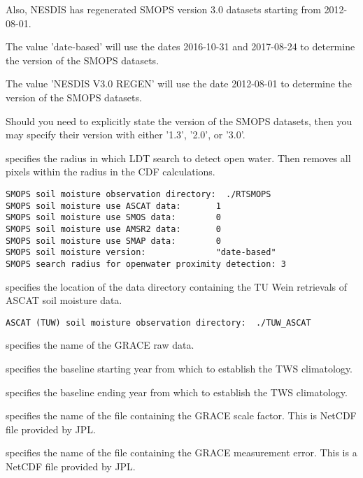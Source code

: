  Also, NESDIS has regenerated SMOPS version 3.0 datasets starting
 from 2012-08-01.
 
 The value 'date-based' will use the dates 2016-10-31 and 2017-08-24
 to determine the version of the SMOPS datasets.
 
 The value 'NESDIS V3.0 REGEN' will use the date 2012-08-01
 to determine the version of the SMOPS datasets.
 
 Should you need to explicitly state the version of the SMOPS datasets,
 then you may specify their version with either '1.3', '2.0', or '3.0'.

 specifies the radius in which LDT search to detect open water.
 Then removes all pixels within the radius in the CDF calculations.
 

 \begin{Verbatim}[frame=single]
SMOPS soil moisture observation directory:  ./RTSMOPS
SMOPS soil moisture use ASCAT data:       1
SMOPS soil moisture use SMOS data:        0
SMOPS soil moisture use AMSR2 data:       0
SMOPS soil moisture use SMAP data:        0
SMOPS soil moisture version:              "date-based"
SMOPS search radius for openwater proximity detection: 3
 \end{Verbatim}

 
 specifies the location of the data directory containing the TU Wein
 retrievals of ASCAT soil moisture data.
 

 \begin{Verbatim}[frame=single]
ASCAT (TUW) soil moisture observation directory:  ./TUW_ASCAT
 \end{Verbatim}


 
 specifies the name of the GRACE raw data.

 specifies the baseline starting year from which to establish the TWS
 climatology.

 specifies the baseline ending year from which to establish the TWS
 climatology.

  specifies the name of the file
 containing the GRACE scale factor.  This is NetCDF file provided
 by JPL.

  specifies the name of the file
 containing the GRACE measurement error.  This is a NetCDF file provided
 by JPL.

